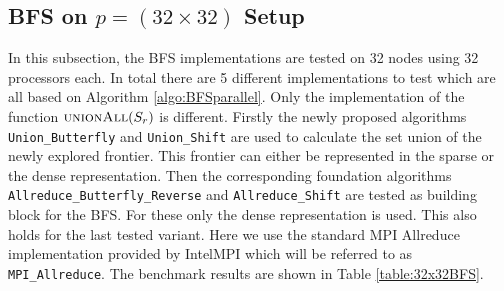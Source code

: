 \subsection{BFS on $p=(32\times 32)$ Setup}
In this subsection, the BFS implementations are tested on 32 nodes using 32 processors each. In total there are 5 different implementations to test which are all based on Algorithm \ref{algo:BFSparallel}. Only the implementation of the function  $\Call{unionAll}{S_r}$ is different. Firstly the newly proposed algorithms  \texttt{Union\_Butterfly} and \texttt{Union\_Shift} are used to calculate the set union of the newly explored frontier. This frontier can either be represented in the sparse or the dense representation. Then the corresponding foundation algorithms  \texttt{All\-re\-duce\_But\-ter\-fly\_Reverse} and \texttt{All\-re\-duce\-\_Shift} are tested as building block for the BFS. For these only the dense representation is used. This also holds for the last tested variant. Here we use the standard MPI Allreduce implementation provided by IntelMPI which will be referred  to as \texttt{MPI\_Allreduce}. The benchmark results are shown in Table \ref{table:32x32BFS}.
